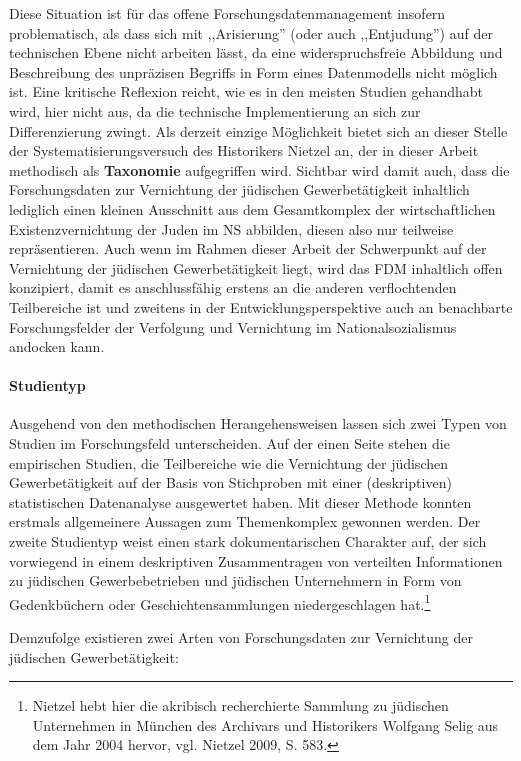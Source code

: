 Diese Situation ist für das offene Forschungsdatenmanagement insofern problematisch, als dass sich mit ,,Arisierung'' (oder auch ,,Entjudung'') auf der technischen Ebene nicht arbeiten lässt, da eine widerspruchsfreie Abbildung und Beschreibung des unpräzisen Begriffs in Form eines Datenmodells nicht möglich ist. Eine kritische Reflexion reicht, wie es in den meisten Studien gehandhabt wird, hier nicht aus, da die technische Implementierung an sich zur Differenzierung zwingt. Als derzeit einzige Möglichkeit bietet sich an dieser Stelle der Systematisierungsversuch des Historikers Nietzel an, der in dieser Arbeit methodisch als \textbf{Taxonomie} aufgegriffen wird. Sichtbar wird damit auch, dass die Forschungsdaten zur Vernichtung der jüdischen Gewerbetätigkeit inhaltlich lediglich einen kleinen Ausschnitt aus dem Gesamtkomplex der wirtschaftlichen Existenzvernichtung der Juden im NS abbilden, diesen also nur teilweise repräsentieren. Auch wenn im Rahmen dieser Arbeit der Schwerpunkt auf der Vernichtung der jüdischen Gewerbetätigkeit liegt, wird das FDM inhaltlich offen konzipiert, damit es anschlussfähig erstens an die anderen verflochtenden Teilbereiche ist und zweitens in der Entwicklungsperspektive auch an benachbarte Forschungsfelder der Verfolgung und Vernichtung im Nationalsozialismus andocken kann. 

\paragraph{Studientyp}Ausgehend von den methodischen Herangehensweisen lassen sich zwei Typen von Studien im Forschungsfeld unterscheiden. Auf der einen Seite stehen die empirischen Studien, die Teilbereiche wie die Vernichtung der jüdischen Gewerbetätigkeit auf der Basis von Stichproben mit einer (deskriptiven) statistischen Datenanalyse ausgewertet haben. Mit dieser Methode konnten erstmals allgemeinere Aussagen zum Themenkomplex gewonnen werden. Der zweite Studientyp weist einen stark dokumentarischen Charakter auf, der sich vorwiegend in einem deskriptiven Zusammentragen von verteilten Informationen zu jüdischen Gewerbebetrieben und jüdischen Unternehmern in Form von Gedenkbüchern oder Geschichtensammlungen niedergeschlagen hat.\footnote{Nietzel hebt hier die akribisch recherchierte Sammlung zu jüdischen Unternehmen in München des Archivars und Historikers Wolfgang Selig aus dem Jahr 2004 hervor, vgl. Nietzel 2009, S. 583.}

Demzufolge existieren zwei Arten von Forschungsdaten zur Vernichtung der jüdischen Gewerbetätigkeit:

